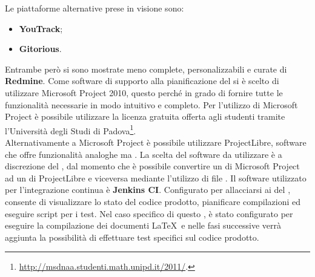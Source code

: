 Le piattaforme alternative prese in visione sono:
\begin{itemize}
\item \textbf{YouTrack};
\item \textbf{Gitorious}.
\end{itemize}
Entrambe però si sono mostrate meno complete, personalizzabili e curate di \textbf{Redmine}.
Come software di supporto alla pianificazione del  si è scelto di utilizzare Microsoft Project 2010, questo perché in grado di fornire tutte le funzionalità necessarie in modo intuitivo e completo. Per l'utilizzo di Microsoft Project è possibile utilizzare la licenza gratuita offerta agli studenti tramite l'Università degli Studi di Padova\footnote{\url{http://msdnaa.studenti.math.unipd.it/2011/}.}.\\
Alternativamente a Microsoft Project è possibile utilizzare ProjectLibre, software che offre funzionalità analoghe ma . La scelta del software da utilizzare è a discrezione del \rRP, dal momento che è possibile convertire un  di Microsoft Project ad un  di ProjectLibre e viceversa mediante l'utilizzo di file .
Il software utilizzato per l'integrazione continua è \textbf{Jenkins CI}.
Configurato per allacciarsi ai  del , consente di visualizzare lo stato del codice prodotto, pianificare compilazioni ed eseguire script per i test. Nel caso specifico di questo , è stato configurato per eseguire la compilazione dei documenti \LaTeX  ~e nelle fasi successive verrà aggiunta la possibilità di effettuare test specifici sul codice prodotto.
